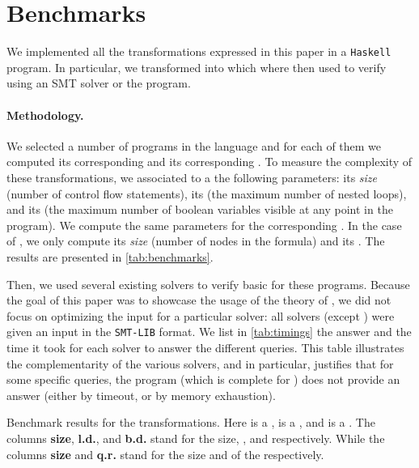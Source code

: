 \section{Benchmarks}
\label{sec:benchmarks}

We implemented all the transformations expressed in this paper in a
\texttt{Haskell} program. In particular, we transformed  into  which where then used to
verify  using an SMT solver or the 
program.

\paragraph{Methodology.} \AP We selected a number of programs in the  language and for each of them we computed its corresponding
 and its corresponding .
To measure the complexity of these transformations, we associated to a
 the following parameters: its \emph{size} (number
of control flow statements), its  (the maximum number of
nested loops), and its  (the maximum number of boolean
variables visible at any point in the program). We compute the same parameters
for the corresponding . In the case of , we only compute its \emph{size} (number of nodes in the
formula) and its . The results are presented in
\cref{tab:benchmarks}.

Then, we used several existing solvers to verify basic  for these programs. Because the goal of this paper was to showcase the
usage of the theory of , we did not focus on
optimizing the input for a particular solver: all solvers (except )
were given an input in the \texttt{SMT-LIB} format. We list in
\cref{tab:timings} the answer and the time it took for each solver to answer
the different queries. This table illustrates the complementarity of the
various solvers, and in particular, justifies that for some specific queries,
the  program (which is complete for )
does not provide an answer (either by timeout, or by memory exhaustion).

\begin{table}[t]
    \caption{Benchmark results for the transformations. 
        Here  is a ,
         is a ,
        and  is a .
        The columns \textbf{size}, \textbf{l.d.}, and \textbf{b.d.} stand for the size, , and
         respectively. While the columns \textbf{size} and \textbf{q.r.} stand for the size and  of the 
         respectively.
    }
    \label{tab:benchmarks}
    \centering
    
\end{table}

